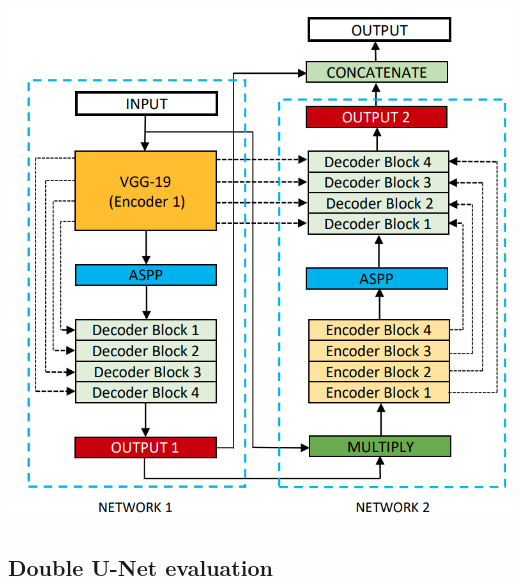 \begin{center}
\includegraphics[width=\textwidth]{images/double_unet.png}
\end{center}
%

\newpage
\subsection{Double U-Net evaluation}

